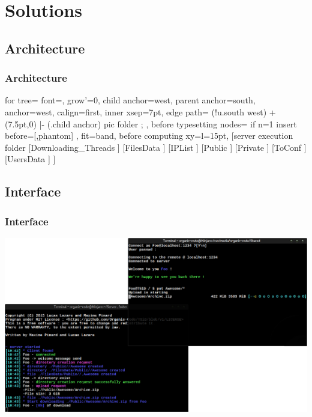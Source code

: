 \documentclass[11pt]{beamer}
\begin{document}
\section{Solutions}
	\subsection{Architecture}

		\begin{frame}
			\frametitle{Architecture}
			\begin{forest}
			  for tree={
			    font=\ttfamily,
			    grow'=0,
			    child anchor=west,
			    parent anchor=south,
			    anchor=west,
			    calign=first,
			    inner xsep=7pt,
			    edge path={
			      \noexpand{}
			      (!u.south west) +(7.5pt,0) |- (.child anchor) pic {folder} ;
			    },
			    before typesetting nodes={
			      if n=1
			        {insert before={[,phantom]}}
			        {}
			    },
			    fit=band,
			    before computing xy={l=15pt},
			  }  
			[server execution folder
			  [Downloading\_Threads
			  ]
			  [FilesData
			  ]
			  [IPList
			  ]
			  [Public
			  ]
			  [Private
			  ]
			  [ToConf
			  ]
			  [UsersData
			  ]
			]
			\end{forest}
		\end{frame}

	\subsection{Interface}

		\begin{frame}
			\frametitle{Interface}
			\includegraphics[width=\linewidth]{interface}
		\end{frame}
\end{document}
